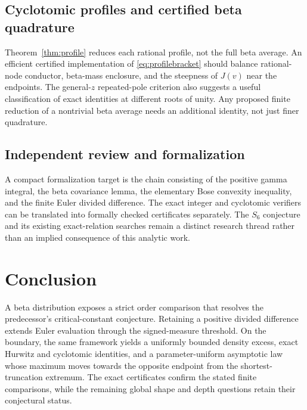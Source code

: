\documentclass[11pt]{article}
\numberwithin{equation}{section}
\theoremstyle{definition}\newtheorem{definition}[theorem]{Definition}
\theoremstyle{remark}\newtheorem{remark}[theorem]{Remark}
\begin{document}
\subsection{Cyclotomic profiles and certified beta quadrature}
Theorem~\ref{thm:profile} reduces each rational profile, not the full
beta average. An efficient certified implementation of
\eqref{eq:profilebracket} should balance rational-node conductor,
beta-mass enclosure, and the steepness of $J(v)$ near the endpoints.
The general-$z$ repeated-pole criterion also suggests a useful
classification of exact identities at different roots of unity.
Any proposed finite reduction of a nontrivial beta average needs an
additional identity, not just finer quadrature.

\subsection{Independent review and formalization}
A compact formalization target is the chain consisting of the
positive gamma integral, the beta covariance lemma, the elementary
Bose convexity inequality, and the finite Euler divided difference.
The exact integer and cyclotomic verifiers can be translated into
formally checked certificates separately. The $S_6$ conjecture and
its existing exact-relation searches remain a distinct research
thread rather than an implied consequence of this analytic work.

\section*{Conclusion}
A beta distribution exposes a strict order comparison that resolves
the predecessor's critical-constant conjecture. Retaining a positive
divided difference extends Euler evaluation through the signed-measure
threshold. On the boundary, the same framework yields a uniformly
bounded density excess, exact Hurwitz and cyclotomic identities, and
a parameter-uniform asymptotic law whose maximum moves towards the
opposite endpoint from the shortest-truncation extremum. The exact
certificates confirm the stated finite comparisons, while the
remaining global shape and depth questions retain their conjectural
status.
\end{document}
